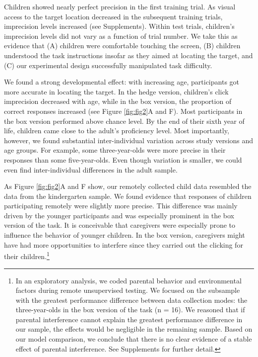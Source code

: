 \documentclass[
  man,floatsintext]{apa7}
\begin{document}
Children showed nearly perfect precision in the first training trial.
As visual access to the target location decreased in the subsequent training trials, imprecision levels increased (see Supplements).
Within test trials, children's imprecision levels did not vary as a function of trial number.
We take this as evidence that (A) children were comfortable touching the screen, (B) children understood the task instructions insofar as they aimed at locating the target, and (C) our experimental design successfully manipulated task difficulty.

We found a strong developmental effect: with increasing age, participants got more accurate in locating the target.
In the hedge version, children's click imprecision decreased with age, while in the box version, the proportion of correct responses increased (see Figure \ref{fig:fig2}A and F).
Most participants in the box version performed above chance level.
By the end of their sixth year of life, children came close to the adult's proficiency level.
Most importantly, however, we found substantial inter-individual variation across study versions and age groups.
For example, some three-year-olds were more precise in their responses than some five-year-olds.
Even though variation is smaller, we could even find inter-individual differences in the adult sample.

As Figure \ref{fig:fig2}A and F show, our remotely collected child data resembled the data from the kindergarten sample.
We found evidence that responses of children participating remotely were slightly more precise.
This difference was mainly driven by the younger participants and was especially prominent in the box version of the task.
It is conceivable that caregivers were especially prone to influence the behavior of younger children.
In the box version, caregivers might have had more opportunities to interfere since they carried out the clicking for their children.\footnote{In an exploratory analysis, we coded parental behavior and environmental factors during remote unsupervised testing.
  We focused on the subsample with the greatest performance difference between data collection modes: the three-year-olds in the box version of the task (n = 16).
  We reasoned that if parental interference cannot explain the greatest performance difference in our sample, the effects would be negligible in the remaining sample.
  Based on our model comparison, we conclude that there is no clear evidence of a stable effect of parental interference.
  See Supplements for further detail.}
\end{document}
